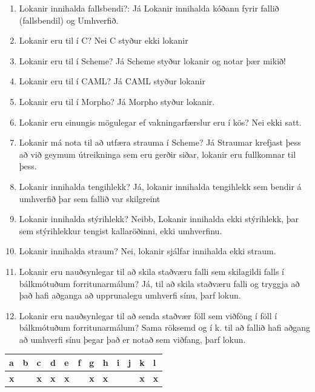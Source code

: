 \documentclass{article}
\newcommand{\bo}[1]{\textbf{#1}}
\newcommand{\enum}{\begin{enumerate}[label = \alph*.]}
\begin{document}
\enum
\item Lokanir innihalda fallsbendi?: Já Lokanir innihalda kóðann fyrir fallið (fallsbendil) og Umhverfið.
\item Lokanir eru til í C? Nei C styður ekki lokanir 
\item Lokanir eru til í Scheme? Já Scheme styður lokanir og notar þær mikið!
\item Lokanir eru til í CAML? Já CAML styður lokanir 
\item Lokanir eru til í Morpho? Já Morpho styður lokanir.
\item Lokanir eru einungis mögulegar ef vakningarfærslur eru í kös? Nei ekki satt.
\item Lokanir má nota til að utfæra strauma í Scheme? Já Straumar krefjast þess að við geymum útreikninga sem eru gerðir siðar, lokanir eru fullkomnar til þess.
\item Lokanir innihalda tengihlekk? Já, lokanir innihalda tengihlekk sem bendir á umhverfið þar sem fallið var skilgreint
\item Lokanir innihalda stýrihlekk? Neibb, Lokanir innihalda ekki stýrihlekk, þar sem stýrihlekkur tengist kallaröðinni, ekki umhverfinu.
\item Lokanir innihalda straum? Nei, lokanir sjálfar innihalda ekki straum.
\item Lokanir eru nauðsynlegar til að skila staðværu falli sem skilagildi falls í bálkmótuðum forritunarmálum? Já, til að skila staðværu falli og tryggja að það
      hafi aðganga að upprunalegu umhverfi sínu, þarf lokun.
\item Lokanir eru nauðsynlegar til að senda staðvær föll sem viðföng í föll í bálkmótuðum forritunarmálum?
      Sama röksemd og í k. til að fallið hafi aðgang að umhverfi sínu þegar það er notað sem viðfang, þarf lokun.

\end{enumerate}


\begin{tabularx}{\textwidth}{ |X|X|X|X|X|X|X|X|X|X|X|X|}
   \hline
   \textbf{a} & \textbf{b} & \textbf{c}  & \textbf{d} & \textbf{e}  & \textbf{f}  & \textbf{g}  & \textbf{h}  & \textbf{i}  & \textbf{j}  & \textbf{k}  & \textbf{l}  \\ \hline
    \bo{x} &  & \bo{x} & \bo{x} & \bo{x} &  & \bo{x} & \bo{x} &  &  & \bo{x} & \bo{x} \\ \hline
    
\end{tabularx}
\end{document}

